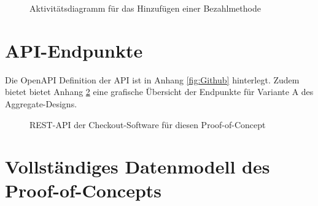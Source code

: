 \begin{anhang}
\begin{figure}[h!]
	\centering
	
	\caption{Aktivitätsdiagramm für das Hinzufügen einer Bezahlmethode}
	\label{fig:SL-PutBezahlmethode}
\end{figure}

\phantom{}
\newpage

\section{API-Endpunkte}

Die OpenAPI Definition der API ist in Anhang \ref{fig:Github} hinterlegt. Zudem bietet bietet Anhang \ref{fig:REST-API} eine grafische Übersicht der Endpunkte für Variante A des Aggregate-Designs.

\begin{figure}[h!]
	\centering
	
	\caption{REST-API der Checkout-Software für diesen Proof-of-Concept}
	\label{fig:REST-API}
\end{figure}

\newpage
\section{Vollständiges Datenmodell des Proof-of-Concepts} \label{label:Daten-Modell}


\end{anhang}

